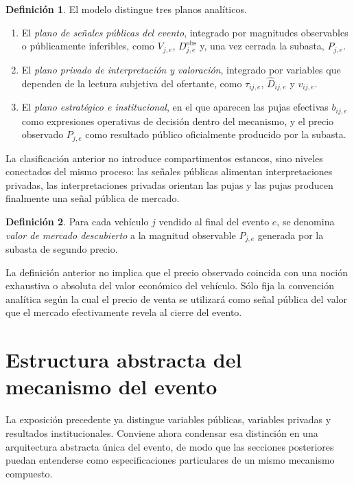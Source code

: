 \documentclass[11pt,a4paper]{article}
\theoremstyle{definition}
\newtheorem{definicion}{Definición}
\begin{document}
\begin{definicion}
El modelo distingue tres planos analíticos.
\begin{enumerate}
    \item El \emph{plano de señales públicas del evento}, integrado por magnitudes observables o públicamente inferibles, como $V_{j,e}$, $D_{j,e}^{\mathrm{obs}}$ y, una vez cerrada la subasta, $P_{j,e}$.
    \item El \emph{plano privado de interpretación y valoración}, integrado por variables que dependen de la lectura subjetiva del ofertante, como $\tau_{ij,e}$, $\widehat D_{ij,e}$ y $v_{ij,e}$.
    \item El \emph{plano estratégico e institucional}, en el que aparecen las pujas efectivas $b_{ij,e}$ como expresiones operativas de decisión dentro del mecanismo, y el precio observado $P_{j,e}$ como resultado público oficialmente producido por la subasta.
\end{enumerate}
\end{definicion}

La clasificación anterior no introduce compartimentos estancos, sino niveles conectados del mismo proceso: las señales públicas alimentan interpretaciones privadas, las interpretaciones privadas orientan las pujas y las pujas producen finalmente una señal pública de mercado.

\begin{definicion}
Para cada vehículo $j$ vendido al final del evento $e$, se denomina \emph{valor de mercado descubierto} a la magnitud observable $P_{j,e}$ generada por la subasta de segundo precio.
\end{definicion}
La definición anterior no implica que el precio observado coincida con una noción exhaustiva o absoluta del valor económico del vehículo. Sólo fija la convención analítica según la cual el precio de venta se utilizará como señal pública del valor que el mercado efectivamente revela al cierre del evento.

\section{Estructura abstracta del mecanismo del evento}

La exposición precedente ya distingue variables públicas, variables privadas y resultados institucionales. Conviene ahora condensar esa distinción en una arquitectura abstracta única del evento, de modo que las secciones posteriores puedan entenderse como especificaciones particulares de un mismo mecanismo compuesto.
\end{document}
